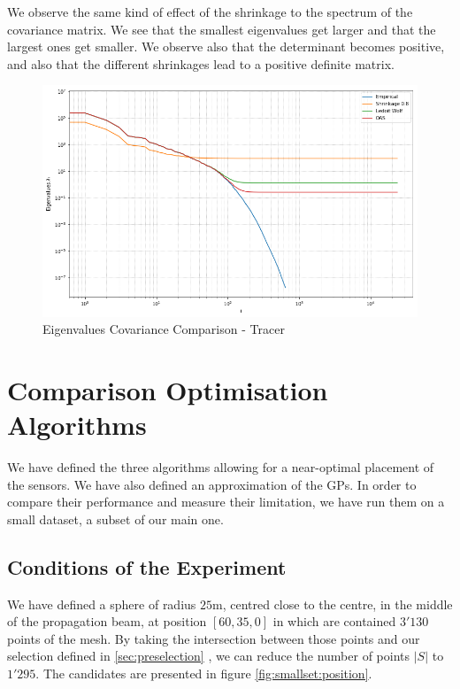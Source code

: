 We observe the same kind of effect of the shrinkage to the spectrum of the covariance matrix. We see that the smallest eigenvalues get larger and that the largest ones get smaller. We observe also that the determinant becomes positive, and also that the different shrinkages lead to a positive definite matrix. 


\begin{figure}[h!]
\centering
    \includegraphics[width=0.8\linewidth]{figures/Covariance/Pressure_23643/cov_all_eigenval_loglog_zoom}
    \caption{Eigenvalues Covariance Comparison - Tracer}
    \label{fig:cov:comparison:eigs}
\end{figure}




\section{Comparison Optimisation Algorithms}

We have defined the three algorithms allowing for a near-optimal placement of the sensors. We have also defined an approximation of the GPs. In order to compare their performance and measure their limitation, we have run them on a small dataset, a subset of our main one. 
\subsection{Conditions of the Experiment}

We have defined a sphere of radius $25$m, centred close to the centre, in the middle of the propagation beam, at position $[60,35,0]$ in which are contained $3'130$ points of the mesh. By taking the intersection between those points and our selection defined in \ref{sec:preselection} , we can reduce the number of points $|S|$ to $1'295$.  The candidates are presented in figure      \ref{fig:smallset:position}.
 \\


